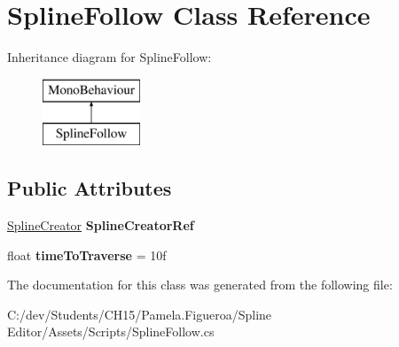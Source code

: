 \hypertarget{class_spline_follow}{}\section{Spline\+Follow Class Reference}
\label{class_spline_follow}
Inheritance diagram for Spline\+Follow\+:\begin{figure}[H]
\begin{center}
\leavevmode
\includegraphics[height=2.000000cm]{class_spline_follow}
\end{center}
\end{figure}
\subsection*{Public Attributes}
\begin{DoxyCompactItemize}
\item 
\mbox{\label{class_spline_follow_a6fbb7307ac86b91f19a3c1f82055a14b}} 
\mbox{\hyperlink{class_spline_creator}{Spline\+Creator}} {\bfseries Spline\+Creator\+Ref}
\item 
\mbox{\label{class_spline_follow_a42a599013c4249e4de2b2e3fcee8cd07}} 
float {\bfseries time\+To\+Traverse} = 10f
\end{DoxyCompactItemize}


The documentation for this class was generated from the following file\+:\begin{DoxyCompactItemize}
\item 
C\+:/dev/\+Students/\+C\+H15/\+Pamela.\+Figueroa/\+Spline Editor/\+Assets/\+Scripts/Spline\+Follow.\+cs\end{DoxyCompactItemize}
